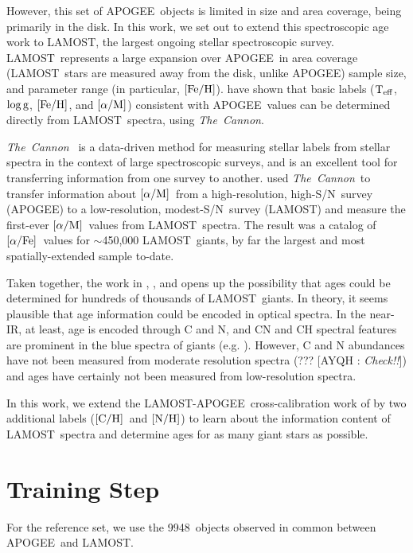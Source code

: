 \documentclass[12pt, preprint]{aastex}
\newcommand{\tc}{\textsl{The~Cannon}}
\newcommand{\apogee}{APOGEE}
\newcommand{\lamost}{LAMOST}
\newcommand{\teff}{\mbox{$\rm T_{eff}$}}
\newcommand{\logg}{\mbox{$\rm \log g$}}
\newcommand{\feh}{\mbox{$\rm [Fe/H]$}}
\newcommand{\afe}{\mbox{$\rm [\alpha/Fe]$}}
\newcommand{\alpham}{\mbox{$\rm [\alpha/M]$}}
\newcommand{\carbon}{\mbox{$\rm [C/H]$}}
\newcommand{\nitrogen}{\mbox{$\rm [N/H]$}}
\newcommand{\ntrobj}{9948}
\newcommand{\snr}{S/N}
\newcommand{\Comment}[2]{ [{\color{red}\sc #1 :} {{\color{cyan} \it #2}}]}
\begin{document}
However, this set of \apogee\ objects is limited in size and area coverage, 
being primarily in the disk.
In this work, we set out to extend this spectroscopic age work to
\lamost, the largest ongoing stellar spectroscopic survey. 
\lamost\ represents a large expansion over \apogee\ in area coverage
(\lamost\ stars are measured away from the disk, unlike \apogee)
sample size, and parameter range (in particular, \feh). 
\citet{Ho2016} have shown that
basic labels (\teff, \logg, \feh, and \alpham) consistent with 
\apogee\ values can be determined directly from \lamost\ spectra,
using \tc.

\tc\ \citep{Ness2015} is a data-driven method for measuring stellar labels 
from stellar spectra in the context of large spectroscopic surveys, 
and is an excellent tool for transferring information from one survey 
to another. 
\citet{Ho2016} used \tc\ to transfer information about \alpham\ from a
high-resolution, high-\snr\ survey (\apogee) to a low-resolution,
modest-\snr\ survey (\lamost) and measure the first-ever \alpham\ values
from \lamost\ spectra. 
The result was a catalog of \afe\ values for $\sim$450,000 \lamost\ giants, 
by far the largest and most spatially-extended sample to-date. 

Taken together, the work in \citet{Martig2016}, \citet{Ness2016}, and
\citet{Ho2016} opens up the possibility that ages could be determined
for hundreds of thousands of \lamost\ giants.
In theory, it seems plausible that age information could
be encoded in optical spectra.
In the near-IR, at least, age is encoded through C and N, and
CN and CH spectral features
are prominent in the blue spectra of giants 
(e.g. \citet{Martell2008}). However, C and N abundances
have not been measured from moderate resolution spectra (???
\Comment{AYQH}{Check!!}) and ages have certainly not been
measured from low-resolution spectra.

In this work, we extend the \lamost-\apogee\ cross-calibration 
work of \citet{Ho2016} by two additional labels (\carbon\ and \nitrogen) 
to learn about the information content of \lamost\ spectra
and determine ages for as many giant stars as possible.

\section{Training Step}
\label{sec:training}

For the reference set, we use the 
\ntrobj\ objects observed in common between
\apogee\ and \lamost.
\end{document}
